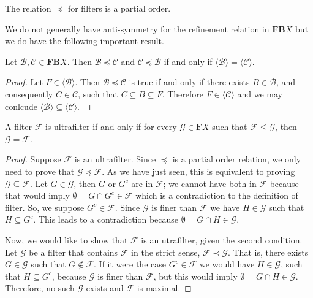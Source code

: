\documentclass [12pt]{book}
\begin{document}
\begin{corollary}The relation $\preceq$ for filters is a partial order.
\end{corollary}

We do not generally have anti-symmetry for the refinement relation in $\textbf{FB}X$ but we do have the following important result.

\begin{proposition}Let $\mathcal B,\mathcal C\in\textbf{FB}X$. Then $\mathcal B\preceq\mathcal C$ and $\mathcal C\preceq\mathcal B$ if and only if $\langle\mathcal B\rangle=\langle\mathcal C\rangle$.\end{proposition}

\begin{proof}Let $F\in\langle\mathcal B\rangle$. Then $\mathcal B\preceq\mathcal C$ is true if and only if there exists $B\in\mathcal B$, and consequently $C\in\mathcal C$, such that $C\subseteq B\subseteq F$. Therefore $F\in\langle\mathcal C\rangle$ and we may conlcude $\langle\mathcal B\rangle\subseteq\langle\mathcal C\rangle$.\end{proof}

\begin{theorem}A filter $\mathcal F$ is ultrafilter if and only if for every $\mathcal G\in\textbf{F}X$ such that $\mathcal F\leq\mathcal G$, then $\mathcal G=\mathcal F$.\end{theorem}

\begin{proof}Suppose $\mathcal F$ is an ultrafilter. Since $\preceq$ is a partial order relation, we only need to prove that $\mathcal G\preceq\mathcal F$. As we have just seen, this is equivalent to proving $\mathcal G\subseteq\mathcal F$. Let $G\in\mathcal G$, then $G$ or $G^c$ are in $\mathcal F$; we cannot have both in $\mathcal F$ because that would imply $\emptyset=G\cap G^c\in\mathcal F$ which is a contradiction to the definition of filter. So, we suppose $G^c\in\mathcal F$. Since $\mathcal G$ is finer than $\mathcal F$ we have $H\in\mathcal G$ such that $H\subseteq G^c$. This leads to a contradiction because $\emptyset=G\cap H\in\mathcal G$.

Now, we would like to show that $\mathcal F$ is an utrafilter, given the second condition. Let $\mathcal G$ be a filter that contains $\mathcal F$ in the strict sense, $\mathcal F\prec\mathcal G$. That is, there exists $G\in\mathcal G$ such that $G\notin \mathcal F$. If it were the case $G^c\in\mathcal F$ we would have $H\in\mathcal G$, such that $H\subseteq G^c$, because $\mathcal G$ is finer than $\mathcal F$, but this would imply $\emptyset=G\cap H\in\mathcal G$. Therefore, no such $\mathcal G$ exists and $\mathcal F$ is maximal.\end{proof}
\end{document}
